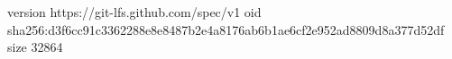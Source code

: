 version https://git-lfs.github.com/spec/v1
oid sha256:d3f6cc91c3362288e8e8487b2e4a8176ab6b1ae6cf2e952ad8809d8a377d52df
size 32864
